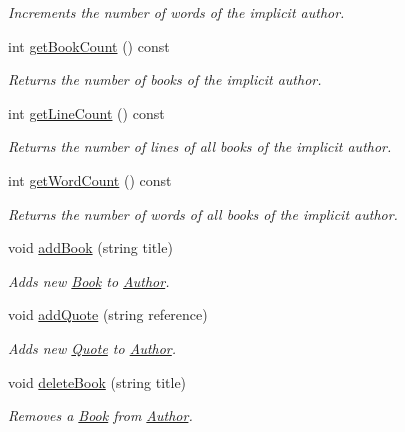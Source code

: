 \begin{DoxyCompactItemize}
\begin{DoxyCompactList}\small\item\em Increments the number of words of the implicit author. \end{DoxyCompactList}\item 
int \hyperlink{class_author_a78febe94924896f8d0ce218d5cd41786}{get\+Book\+Count} () const 
\begin{DoxyCompactList}\small\item\em Returns the number of books of the implicit author. \end{DoxyCompactList}\item 
int \hyperlink{class_author_af24acf9a0c70fc700edccfb956c2bace}{get\+Line\+Count} () const 
\begin{DoxyCompactList}\small\item\em Returns the number of lines of all books of the implicit author. \end{DoxyCompactList}\item 
int \hyperlink{class_author_a4899e9145b70a9e6fcad9a55b3b5285d}{get\+Word\+Count} () const 
\begin{DoxyCompactList}\small\item\em Returns the number of words of all books of the implicit author. \end{DoxyCompactList}\item 
void \hyperlink{class_author_a5836c0e00e740d4e9e9049e94f032cc3}{add\+Book} (string title)
\begin{DoxyCompactList}\small\item\em Adds new \hyperlink{class_book}{Book} to \hyperlink{class_author}{Author}. \end{DoxyCompactList}\item 
void \hyperlink{class_author_a8605dbbab320ca251f3c64e782cf40b3}{add\+Quote} (string reference)
\begin{DoxyCompactList}\small\item\em Adds new \hyperlink{class_quote}{Quote} to \hyperlink{class_author}{Author}. \end{DoxyCompactList}\item 
void \hyperlink{class_author_ad48c2d5ae47d521bf5d4aa638bb86976}{delete\+Book} (string title)
\begin{DoxyCompactList}\small\item\em Removes a \hyperlink{class_book}{Book} from \hyperlink{class_author}{Author}. \end{DoxyCompactList}\item 

\end{DoxyCompactItemize}
